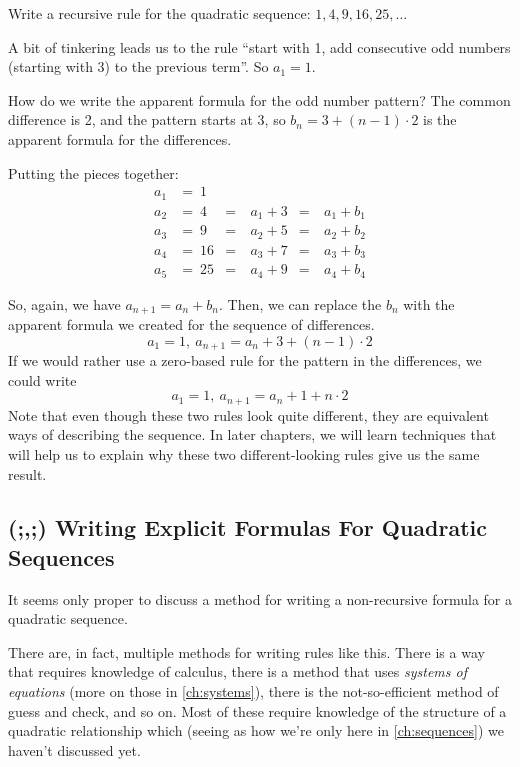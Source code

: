 \begin{boxedex}
Write a recursive rule for the quadratic sequence: $1, 4, 9, 16, 25,\dotsc$

\exsoln{} A bit of tinkering leads us to the rule ``start with 1, add consecutive odd numbers (starting with 3) to the previous term''. So $a_1 = 1$.

How do we write the apparent formula for the odd number pattern? The common difference is 2, and the pattern starts at 3, so $b_n = 3 + (n-1)\cdot2$ is the apparent formula for the differences.

Putting the pieces together:
\[\begin{aligned}
a_1 &=~1\\
a_2 &=~4	&=~& a_1 + 3		&=~& a_1 + b_1\\
a_3 &=~9	&=~& a_2 + 5		&=~& a_2 + b_2\\
a_4 &=~16	&=~& a_3 + 7		&=~& a_3 + b_3\\
a_5 &=~25	&=~& a_4 + 9		&=~& a_4 + b_4
\end{aligned}\]

So, again, we have $a_{n+1} = a_n + b_n$. Then, we can replace the $b_n$ with the apparent formula we created for the sequence of differences. \[a_1 = 1, ~ a_{n+1} = a_n + 3 + (n-1)\cdot 2\]
If we would rather use a zero-based rule for the pattern in the differences, we could write \[a_1 = 1, ~ a_{n+1} = a_n + 1 + n \cdot 2\]
Note that even though these two rules look quite different, they are equivalent ways of describing the sequence. In later chapters, we will learn techniques that will help us to explain why these two different-looking rules give us the same result.
\end{boxedex}


\subsection{(;,;) Writing Explicit Formulas For Quadratic Sequences}

It seems only proper to discuss a method for writing a non-recursive formula for a quadratic sequence.

There are, in fact, multiple methods for writing rules like this. There is a way that requires knowledge of calculus, there is a method that uses \textit{systems of equations} (more on those in \cref{ch:systems}), there is the not-so-efficient method of guess and check, and so on. Most of these require knowledge of the structure of a quadratic relationship which (seeing as how we're only here in \cref{ch:sequences}) we haven't discussed yet.

